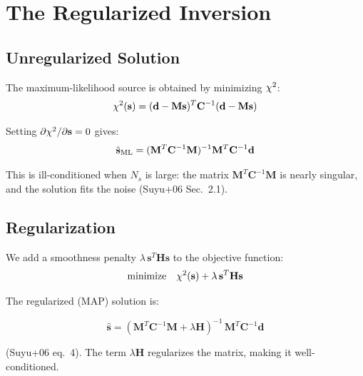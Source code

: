 \documentclass[11pt, letterpaper]{article}
\begin{document}
\section{The Regularized Inversion}
\label{sec:inversion}

\subsection{Unregularized Solution}

The maximum-likelihood source is obtained by minimizing $\chi^2$:
\begin{equation}
\chi^2(\mathbf{s}) = (\mathbf{d} - \mathbf{M}\mathbf{s})^T
\mathbf{C}^{-1} (\mathbf{d} - \mathbf{M}\mathbf{s})
\end{equation}

Setting $\partial\chi^2/\partial\mathbf{s} = 0$ gives:
\begin{equation}
\hat{\mathbf{s}}_{\rm ML} = (\mathbf{M}^T \mathbf{C}^{-1} \mathbf{M})^{-1}
\mathbf{M}^T \mathbf{C}^{-1} \mathbf{d}
\label{eq:ml-solution}
\end{equation}

This is ill-conditioned when $N_s$ is large: the matrix
$\mathbf{M}^T \mathbf{C}^{-1} \mathbf{M}$ is nearly singular,
and the solution fits the noise (Suyu+06 Sec.~2.1).

\subsection{Regularization}

We add a smoothness penalty $\lambda\,\mathbf{s}^T\mathbf{H}\mathbf{s}$
to the objective function:
\begin{equation}
\text{minimize}\quad
\chi^2(\mathbf{s}) + \lambda\,\mathbf{s}^T\mathbf{H}\mathbf{s}
\end{equation}

The regularized (MAP) solution is:

\begin{keyresult}
\begin{equation}
\hat{\mathbf{s}} = (\mathbf{M}^T \mathbf{C}^{-1} \mathbf{M}
+ \lambda\mathbf{H})^{-1}\,\mathbf{M}^T \mathbf{C}^{-1} \mathbf{d}
\label{eq:map-solution}
\end{equation}
\end{keyresult}

\noindent (Suyu+06 eq.~4). The term $\lambda\mathbf{H}$ regularizes
the matrix, making it well-conditioned.
\end{document}
